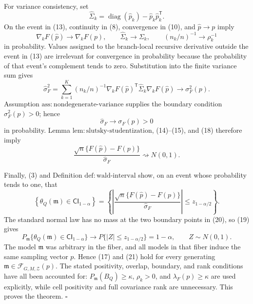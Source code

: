 For variance consistency, set
\[
 \widehat\Sigma_k
 =\operatorname{diag}(\widehat p_k)
  -\widehat p_k\widehat p_k^{\mathsf T}.
\]
On the event in (13), continuity in (8), convergence in (10), and \(\widehat p\to p\) imply
\[
 \nabla_kF(\widehat p)\to\nabla_kF(p),
 \qquad
 \widehat\Sigma_k\to\Sigma_k,
 \qquad
 (n_k/n)^{-1}\to\rho_k^{-1} \tag{16}
\]
in probability.  Values assigned to the branch-local recursive derivative outside the event in (13) are irrelevant for convergence in probability because the probability of that event's complement tends to zero.  Substitution into the finite variance sum gives
\[
 \widehat\sigma_F^2
 =\sum_{k=1}^{K}(n_k/n)^{-1}
   \nabla_kF(\widehat p)^{\mathsf T}
   \widehat\Sigma_k
   \nabla_kF(\widehat p)
 \longrightarrow\sigma_F^2(p). \tag{17}
\]
Assumption \(\mathrm{ass:nondegenerate\text{-}variance}\) supplies the boundary condition \(\sigma_F^2(p)>0\); hence
\[
 \widehat\sigma_F\longrightarrow\sigma_F(p)>0 \tag{18}
\]
in probability.  Lemma \(\mathrm{lem:slutsky\text{-}studentization}\), (14)--(15), and (18) therefore imply
\[
 \frac{\sqrt n\{F(\widehat p)-F(p)\}}
      {\widehat\sigma_F}
 \rightsquigarrow N(0,1). \tag{19}
\]

Finally, (3) and Definition \(\mathrm{def:wald\text{-}interval}\) show, on an event whose probability tends to one, that
\[
 \left\{\theta_Q(\mathfrak m)\in\mathsf{CI}_{1-\alpha}\right\}
 =
 \left\{
 \left|
 \frac{\sqrt n\{F(\widehat p)-F(p)\}}
      {\widehat\sigma_F}
 \right|
 \leq z_{1-\alpha/2}
 \right\}. \tag{20}
\]
The standard normal law has no mass at the two boundary points in (20), so (19) gives
\[
 P_{\mathfrak m}\{\theta_Q(\mathfrak m)\in\mathsf{CI}_{1-\alpha}\}
 \longrightarrow
 P\{|Z|\leq z_{1-\alpha/2}\}
 =1-\alpha,
 \qquad Z\sim N(0,1). \tag{21}
\]
The model \(\mathfrak m\) was arbitrary in the fiber, and all models in that fiber induce the same sampling vector \(p\).  Hence (17) and (21) hold for every generating \(\mathfrak m\in\mathcal F_{G,M,\mathcal Z}(p)\).  The stated positivity, overlap, boundary, and rank conditions have all been accounted for: \(P_{\mathfrak m}(B_Q)\geq\kappa\), \(\rho_k>0\), and \(\lambda_F(p)\geq\kappa\) are used explicitly, while cell positivity and full covariance rank are unnecessary.  This proves the theorem. \(\square\)